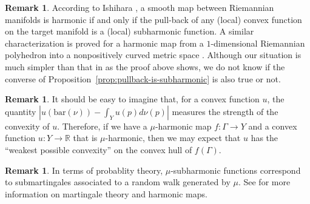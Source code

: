\documentclass[12pt]{amsart}
\numberwithin{equation}{section}
\theoremstyle{plain}
\theoremstyle{definition}
\newtheorem{Remark}[Theorem]{Remark}
\theoremstyle{remark}
\newcommand{\R}{{\mathbb R}}
\newcommand{\bary}[1]{\mathrm{bar}(#1)}
\begin{document}
\begin{Remark}
 According to Ishihara \cite[Theorem 3.4]{ishihara}, a smooth map
 between Riemannian manifolds is harmonic if and only if the pull-back
 of any (local) convex function on the target manifold is a (local)
 subharmonic function. 
 A similar characterization is proved for a harmonic map from 
 a $1$-dimensional Riemannian polyhedron into a nonpositively curved
 metric space \cite[Proposition 12.4]{eells-fuglede}. 
 Although our situation is much simpler than that in
 \cite{eells-fuglede} as the proof above shows, we do not know if the
 converse of Proposition~\ref{prop:pullback-is-subharmonic} is also true
 or not. 
\end{Remark} 

\begin{Remark}
 It should be easy to imagine that, for a convex function $u$, 
 the quantity $|u(\bary{\nu})-\int_Y u(p) d\nu(p)|$ measures the
 strength of the convexity of $u$. 
 Therefore, if we have a $\mu$-harmonic map 
 $f\colon \Gamma \rightarrow Y$ and a convex function 
 $u\colon Y\rightarrow \R$ that is $\mu$-harmonic, then
 we may expect that $u$ has the ``weakest possible convexity''
 on the convex hull of $f(\Gamma)$. 
\end{Remark}

\begin{Remark}
 In terms of probablity theory, 
 $\mu$-subharmonic functions correspond to submartingales associated to
 a random walk generated by $\mu$.  See \cite{sturm}
 for more information on martingale theory and harmonic maps. 
\end{Remark}
\end{document}
